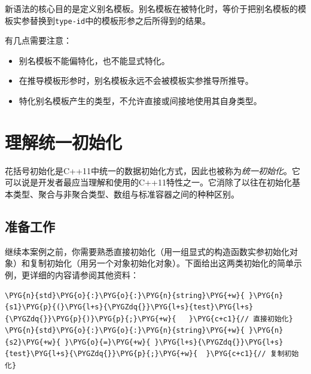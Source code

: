
新语法的核心目的是定义别名模板。别名模板在被特化时，等价于把别名模板的模板实参替换到\texttt{type-\allowbreak{}id}中的模板形参之后所得到的结果。



有几点需要注意：



\begin{itemize}
\item 别名模板不能偏特化，也不能显式特化。



\item 在推导模板形参时，别名模板永远不会被模板实参推导所推导。



\item 特化别名模板产生的类型，不允许直接或间接地使用其自身类型。

\end{itemize}



\section{理解统一初始化}



花括号初始化是C++11中统一的数据初始化方式，因此也被称为\textit{统一初始化}。它可以说是开发者最应当理解和使用的C++11特性之一。它消除了以往在初始化基本类型、聚合与非聚合类型、数组与标准容器之间的种种区别。



\subsection{准备工作}



继续本案例之前，你需要熟悉直接初始化（用一组显式的构造函数实参初始化对象）和复制初始化（用另一个对象初始化对象）。下面给出这两类初始化的简单示例，更详细的内容请参阅其他资料：



\begin{codeblockbg}
\begin{Verbatim}[commandchars=\\\{\},breaklines=true,breakanywhere=true,fontsize=\codefont,xleftmargin=17bp]
\PYG{n}{std}\PYG{o}{:}\PYG{o}{:}\PYG{n}{string}\PYG{+w}{ }\PYG{n}{s1}\PYG{p}{(}\PYG{l+s}{\PYGZdq{}}\PYG{l+s}{test}\PYG{l+s}{\PYGZdq{}}\PYG{p}{)}\PYG{p}{;}\PYG{+w}{   }\PYG{c+c1}{// 直接初始化}
\PYG{n}{std}\PYG{o}{:}\PYG{o}{:}\PYG{n}{string}\PYG{+w}{ }\PYG{n}{s2}\PYG{+w}{ }\PYG{o}{=}\PYG{+w}{ }\PYG{l+s}{\PYGZdq{}}\PYG{l+s}{test}\PYG{l+s}{\PYGZdq{}}\PYG{p}{;}\PYG{+w}{  }\PYG{c+c1}{// 复制初始化}
\end{Verbatim}
\end{codeblockbg}


